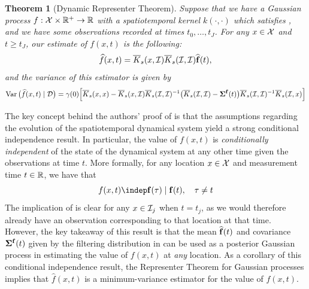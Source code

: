 \documentclass[10pt]{article}
\newtheorem{theorem}{Theorem}[section]
\numberwithin{equation}{section}
\begin{document}
\begin{theorem}[Dynamic Representer Theorem]
\label{thm:dynamic-representer-theorem}
    Suppose that we have a Gaussian process $f: \mathcal{X} \times \mathbb{R}^{+} \to \mathbb{R}$ with a spatiotemporal kernel $k(\cdot, \cdot)$ which satisfies , and we have some observations recorded at times $t_{0}, \dots, t_{J}$. For any $x \in \mathcal{X}$ and $t \ge t_{J}$, our estimate of $f(x, t)$ is the following:
    \begin{equation}
    \label{eq:dynamic-rep-mean}
        \widehat{f}(x, t) = \overline{K}_{s}(x, \mathcal{I})\overline{K}_{s}(\mathcal{I}, \mathcal{I})\widehat{\mathbf{f}}(t),
    \end{equation}
    and the variance of this estimator is given by
    {\small 
    \begin{equation}
    \label{eq:dynamic-rep-var}
        \operatorname{Var}\big(\widehat{f}(x, t) \mid \mathcal{D}\big) = \gamma(0)\Big[\overline{K}_{s}(x, x) - \overline{K}_{s}(x, \mathcal{I})\overline{K}_{s}(\mathcal{I}, \mathcal{I})^{-1}\big(\overline{K}_{s}(\mathcal{I}, \mathcal{I}) - \bm{\Sigma}^{\mathbf{f}}(t)\big)\overline{K}_{s}(\mathcal{I}, \mathcal{I})^{-1}\overline{K}_{s}(\mathcal{I}, x)\Big]
    \end{equation}
    }
\end{theorem}

The key concept behind the authors' proof of  is that the assumptions regarding the evolution of the spatiotemporal dynamical system yield a strong conditional independence result. In particular, the value of $f(x, t)$ is \emph{conditionally independent} of the state of the dynamical system at any other time given the observations at time $t$. More formally, for any location $x \in \mathcal{X}$ and measurement time $t \in \mathbb{R}$, we have that
\begin{equation}
\label{eq:todescato-cond-indep}
    f(x, t) \indep \bff(\tau) \mid \bff(t), \quad \tau \ne t
\end{equation}
The implication of  is clear for any $x \in \mathcal{I}_{j}$ when $t = t_{j}$, as we would therefore already have an observation corresponding to that location at that time. However, the key takeaway of this result is that the mean $\widehat{\mathbf{f}}(t)$ and covariance $\bm{\Sigma}^{\mathbf{f}}(t)$ given by the filtering distribution in  can be used as a posterior Gaussian process in estimating the value of $f(x, t)$ at \emph{any} location. As a corollary of this conditional independence result, the Representer Theorem  for Gaussian processes implies that $\widehat{f}(x, t)$ is a minimum-variance estimator for the value of $f(x, t)$.
\end{document}
